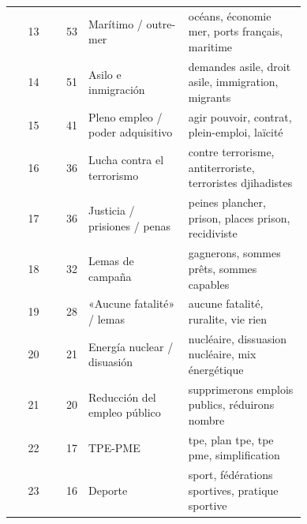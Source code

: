 {\begin{longtable}{@{}r r >{\raggedright\arraybackslash}p{0.34\linewidth} >{\raggedright\arraybackslash}p{0.40\linewidth}@{}}
13 & 53 & Marítimo / outre-mer & océans, économie mer, ports français, maritime \\
14 & 51 & Asilo e inmigración & demandes asile, droit asile, immigration, migrants \\
15 & 41 & Pleno empleo / poder adquisitivo & agir pouvoir, contrat, plein-emploi, laïcité \\
16 & 36 & Lucha contra el terrorismo & contre terrorisme, antiterroriste, terroristes djihadistes \\
17 & 36 & Justicia / prisiones / penas & peines plancher, prison, places prison, recidiviste \\
18 & 32 & Lemas de campaña & gagnerons, sommes prêts, sommes capables \\
19 & 28 & «Aucune fatalité» / lemas & aucune fatalité, ruralite, vie rien \\
20 & 21 & Energía nuclear / disuasión & nucléaire, dissuasion nucléaire, mix énergétique \\
21 & 20 & Reducción del empleo público & supprimerons emplois publics, réduirons nombre \\
22 & 17 & TPE-PME & tpe, plan tpe, tpe pme, simplification \\
23 & 16 & Deporte & sport, fédérations sportives, pratique sportive \\
\end{longtable}
}

